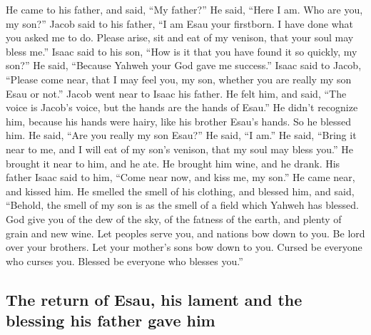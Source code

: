  He came to his father, and said, ``My father?'' He said,
``Here I am. Who are you, my son?''  Jacob said to his
father, ``I am Esau your firstborn. I have done what you asked me to do.
Please arise, sit and eat of my venison, that your soul may bless me.''
 Isaac said to his son, ``How is it that you have found
it so quickly, my son?'' He said, ``Because Yahweh your God gave me
success.''  Isaac said to Jacob, ``Please come near, that
I may feel you, my son, whether you are really my son Esau or not.''
 Jacob went near to Isaac his father. He felt him, and
said, ``The voice is Jacob's voice, but the hands are the hands of
Esau.''  He didn't recognize him, because his hands were
hairy, like his brother Esau's hands. So he blessed him. 
He said, ``Are you really my son Esau?'' He said, ``I am.''
 He said, ``Bring it near to me, and I will eat of my
son's venison, that my soul may bless you.'' He brought it near to him,
and he ate. He brought him wine, and he drank.  His
father Isaac said to him, ``Come near now, and kiss me, my son.''
 He came near, and kissed him. He smelled the smell of
his clothing, and blessed him, and said, ``Behold, the smell of my son
is as the smell of a field which Yahweh has blessed.  God
give you of the dew of the sky, of the fatness of the earth, and plenty
of grain and new wine.  Let peoples serve you, and
nations bow down to you. Be lord over your brothers. Let your mother's
sons bow down to you. Cursed be everyone who curses you. Blessed be
everyone who blesses you.''

\hypertarget{the-return-of-esau-his-lament-and-the-blessing-his-father-gave-him}{%
\subsection{The return of Esau, his lament and the blessing his father
gave
him}\label{the-return-of-esau-his-lament-and-the-blessing-his-father-gave-him}}


